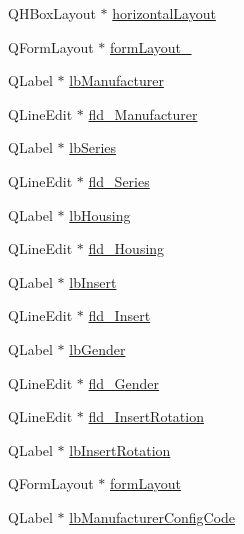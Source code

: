 \begin{DoxyCompactItemize}
\item 
Q\-H\-Box\-Layout $\ast$ \hyperlink{class_ui__mdt_cl_connector_editor_a30390e248b79f1e006eb70ad31fd74ac}{horizontal\-Layout}
\item 
Q\-Form\-Layout $\ast$ \hyperlink{class_ui__mdt_cl_connector_editor_aeb5562d1041525d05a602074883c1d6b}{form\-Layout\-\_}
\item 
Q\-Label $\ast$ \hyperlink{class_ui__mdt_cl_connector_editor_a55a3b01fb8e019196b4c8300c38ed807}{lb\-Manufacturer}
\item 
Q\-Line\-Edit $\ast$ \hyperlink{class_ui__mdt_cl_connector_editor_a43426cbc31767a4b137a91a3f2ad4c2b}{fld\-\_\-\-Manufacturer}
\item 
Q\-Label $\ast$ \hyperlink{class_ui__mdt_cl_connector_editor_a39ccec5a8b4098df19f6b7f05cdde6fd}{lb\-Series}
\item 
Q\-Line\-Edit $\ast$ \hyperlink{class_ui__mdt_cl_connector_editor_a8c98d5a3b9de692d79f01b636f643538}{fld\-\_\-\-Series}
\item 
Q\-Label $\ast$ \hyperlink{class_ui__mdt_cl_connector_editor_ad79151f657941d747e74ccf221bab930}{lb\-Housing}
\item 
Q\-Line\-Edit $\ast$ \hyperlink{class_ui__mdt_cl_connector_editor_acbab217f449a089e9a134371ef07415e}{fld\-\_\-\-Housing}
\item 
Q\-Label $\ast$ \hyperlink{class_ui__mdt_cl_connector_editor_a13d3dc6d45de0bb9607d3607a16d11a4}{lb\-Insert}
\item 
Q\-Line\-Edit $\ast$ \hyperlink{class_ui__mdt_cl_connector_editor_a07a5618dd8e252b5ed533b38f3c5a4ad}{fld\-\_\-\-Insert}
\item 
Q\-Label $\ast$ \hyperlink{class_ui__mdt_cl_connector_editor_a030fbb6e1fd44d609159ba08dca22cbd}{lb\-Gender}
\item 
Q\-Line\-Edit $\ast$ \hyperlink{class_ui__mdt_cl_connector_editor_a529819c9704f981a3b1328268a57e888}{fld\-\_\-\-Gender}
\item 
Q\-Line\-Edit $\ast$ \hyperlink{class_ui__mdt_cl_connector_editor_a601c7c4045a1dce3cb21b47ed41ee56e}{fld\-\_\-\-Insert\-Rotation}
\item 
Q\-Label $\ast$ \hyperlink{class_ui__mdt_cl_connector_editor_a4a5d32d675f4263f108fba4490cc7f4e}{lb\-Insert\-Rotation}
\item 
Q\-Form\-Layout $\ast$ \hyperlink{class_ui__mdt_cl_connector_editor_a1008ba6491f57c0893c2816660669618}{form\-Layout}
\item 
Q\-Label $\ast$ \hyperlink{class_ui__mdt_cl_connector_editor_a9cf66633ee0cf08a66fa03b4b21d28b4}{lb\-Manufacturer\-Config\-Code}

\end{DoxyCompactItemize}
